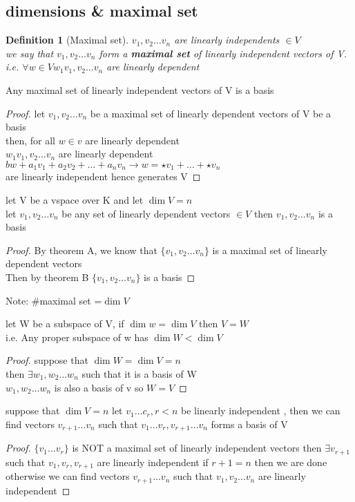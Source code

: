 \documentclass{article}
\newtheorem*{definition}{Definition}
\newcommand{\vs}{v_1,v_2\dots v_n}
\newcommand{\ws}{w_1,w_2\dots w_n}
\newcommand{\brac}[1]{\{#1\}}
\newcommand{\lincom}{a_1v_1+a_2v_2+\dots+a_nv_n}
\newcommand{\li}{linearly independent }
\newcommand{\ld}{linearly dependent }
\newenvironment{corollary}[2][Corollary]{\begin{trivlist}
\item[\hskip \labelsep {\bfseries #1}\hskip \labelsep {\bfseries #2.}]}{\end{trivlist}}
\begin{document}
\subsection{dimensions \& maximal set}
\begin{definition}
    [Maximal set] $\vs$ are linearly independents $\in V$
    \\we say that $\vs$ form a \textbf{maximal set} of linearly independent vectors of V. \\i.e. $\forall w \in V w_1\vs $ are \ld
\end{definition}
\begin{theorem}
    [B] Any maximal set of \li vectors of V is a basis
\end{theorem}
\begin{proof}
    let $\vs$ be a maximal set of \ld vectors of V be a basis\\
    then, for all $w\in v$ are \ld\\$w_1 \vs $ are \ld\\
    $bw+\lincom \to w =\star v_1+\dots + \star v_n$\\
    are linearly independent hence generates V
    
\end{proof}
\begin{theorem}
    [C] let V be a vspace over K and let $\dim V=n$
    \\let $\vs$ be any set of \ld vectors $\in V$ then $\vs$ is a basis\\
    \end{theorem}
\begin{proof}
    By theorem A, we know that $\brac{\vs}$ is a maximal set of \ld vectors\\
    Then by theorem B $\brac{\vs}$ is a basis
\end{proof}
Note: \#maximal set =$\dim V$\\
\begin{corollary}
K let W be a subspace of V, if $\dim w =\dim V$ then $V=W$\\i.e. Any proper subspace of w has $\dim W < \dim V$
\end{corollary}
\begin{proof}
    suppose that $\dim W=\dim V=n$\\then $\exists \ws$ such that it is a basis of W\\$\ws$ is also a basis of v so $W=V$
    
\end{proof}
\begin{corollary}
    L suppose that $\dim V=n$ let $v_1\dots c_r ,r<n$ be \li, then we can find vectors $v_{r+1} \dots v_n$ such that $v_1\dots v_r, v_{r+1} \dots v_n$ forms a basis of V
    
\end{corollary}
\begin{proof}
    $\brac{v_1\dots v_r}$ is NOT a maximal set of \li vectors then $\exists v_{r+1}$ such that $v_1,v_r,v_{r+1}$ are \li if $r+1=n$ then we are done\\otherwise we can find vectors $v_{r+1}\dots v_n$ such that $\vs $ are \li
\end{proof}
\end{document}
